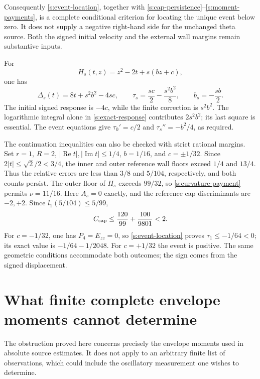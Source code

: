 Consequently \eqref{s:event-location}, together with
\eqref{s:cap-persistence}--\eqref{s:moment-payments}, is a complete
conditional criterion for locating the unique event below zero.  It
does not supply a negative right-hand side for the unchanged theta
source.  Both the signed initial velocity and the external wall
margins remain substantive inputs.

\begin{example}
\label{s:quadratic-control}
For
\[
 H_s(t,z)=z^2-2t+s(bz+c),
\]
one has
\[
 \Delta_s(t)=8t+s^2b^2-4sc,\qquad
 \tau_s=\frac{sc}{2}-\frac{s^2b^2}{8},\qquad b_s=-\frac{sb}{2}.
\]
The initial signed response is $-4c$, while the finite correction is
$s^2b^2$.  The logarithmic integral alone in
\eqref{s:exact-response} contributes $2s^2b^2$; its last square is
essential.  The event equations give $\tau_0'=c/2$ and
$\tau_s''=-b^2/4$, as required.

The continuation inequalities can also be checked with strict rational
margins.  Set $r=1$, $R=2$, $|\operatorname{Re}t|,
|\operatorname{Im}t|\le1/4$, $b=1/16$, and $c=\pm1/32$.
Since $2|t|\le\sqrt2/2<3/4$, the inner and outer reference wall
floors exceed $1/4$ and $13/4$.  Thus the relative errors are less
than $3/8$ and $5/104$, respectively, and both counts persist.  The
outer floor of $H_s$ exceeds $99/32$, so
\eqref{s:curvature-payment} permits $\nu=11/16$.
Here $A_s=0$ exactly, and the reference cap discriminants are $-2,+2$.
Since $l_1(5/104)\le5/99$,
\[
 C_{\rm cap}\le\frac{120}{99}+\frac{100}{9801}<2.
\]
For $c=-1/32$, one has $P_4=E_{zz}=0$, so
\eqref{s:event-location} proves $\tau_1\le-1/64<0$; its exact value
is $-1/64-1/2048$.  For $c=+1/32$ the event is positive.  The same
geometric conditions accommodate both outcomes; the sign comes from
the signed displacement.
\end{example}

\section{What finite complete envelope moments cannot determine}
\label{s:moment-obstruction}

The obstruction proved here concerns precisely the envelope moments
used in absolute source estimates.  It does not apply to an arbitrary
finite list of observations, which could include the oscillatory
measurement one wishes to determine.


